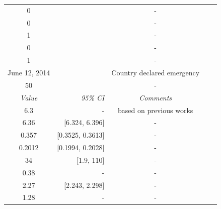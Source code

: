 \documentclass[10pt, journal,onecolumn]{IEEEtran}
\begin{document}
\begin{appendix}
\begin{table}[h]
{\begin{tabular}{@{}crccc@{}}
0& & -\\
0& & -\\
1& & -\\
0& & -\\
1& &-\\
June 12, 2014 &  & Country declared emergency\\
50 & & -\\
\cmidrule{1-3}
\textit{Value} & \textit{95\% CI} & \textit{Comments} \\
\midrule
6.3 & - & based on previous works \cite{}\\
6.36 & [6.324, 6.396] & -\\
0.357 & [0.3525, 0.3613] & -\\
0.2012 & [0.1994, 0.2028] & -\\
34 & [1.9, 110] & -\\
0.38 & - & -\\
2.27 &[2.243, 2.298] &-\\
1.28 & - &-\\
\end{tabular}
}
\end{table}



\end{appendix}
\end{document}
